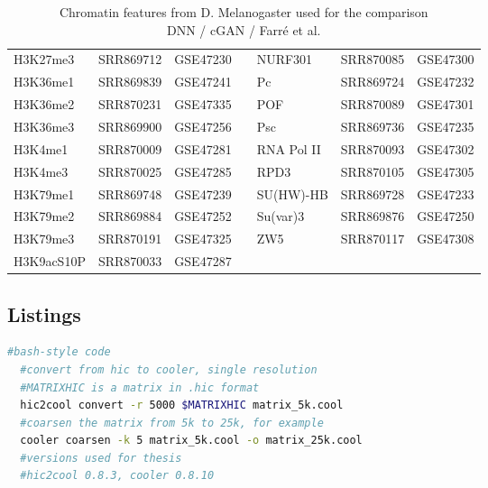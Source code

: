 \begin{table}[htbp]
\begin{tabular}{lllllll}
H3K27me3         & SRR869712           & GSE47230         &  & NURF301          & SRR870085 & GSE47300 \\
H3K36me1         & SRR869839           & GSE47241         &  & Pc               & SRR869724 & GSE47232 \\
H3K36me2         & SRR870231           & GSE47335         &  & POF              & SRR870089 & GSE47301 \\
H3K36me3         & SRR869900           & GSE47256         &  & Psc              & SRR869736 & GSE47235 \\
H3K4me1          & SRR870009           & GSE47281         &  & RNA Pol II       & SRR870093 & GSE47302 \\
H3K4me3          & SRR870025           & GSE47285         &  & RPD3             & SRR870105 & GSE47305 \\
H3K79me1         & SRR869748           & GSE47239         &  & SU(HW)-HB        & SRR869728 & GSE47233 \\
H3K79me2         & SRR869884           & GSE47252         &  & Su(var)3         & SRR869876 & GSE47250 \\
H3K79me3         & SRR870191           & GSE47325         &  & ZW5              & SRR870117 & GSE47308 \\
H3K9acS10P       & SRR870033           & GSE47287         &  &                  &           &          \\ \hline
\end{tabular}
\caption[Chromatin features from D. Melanogaster used for the comparison DNN / cGAN / Farré et al. \cite{Farre2018a}]{Chromatin features from D. Melanogaster used for the comparison\\DNN / cGAN / Farré et al. \cite{Farre2018a}}
\label{tab:appendix:features_farre}
\end{table}
\clearpage
\subsection{Listings}
\begin{lstlisting}[language=bash, caption=Hic to cooler, label=list:methods:hic2cool]
  #bash-style code
  #convert from hic to cooler, single resolution
  #MATRIXHIC is a matrix in .hic format
  hic2cool convert -r 5000 $MATRIXHIC matrix_5k.cool
  #coarsen the matrix from 5k to 25k, for example
  cooler coarsen -k 5 matrix_5k.cool -o matrix_25k.cool
  #versions used for thesis
  #hic2cool 0.8.3, cooler 0.8.10
\end{lstlisting}



